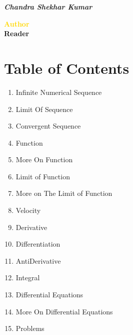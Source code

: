\thispagestyle{empty}

\vspace{3mm}

  \hfill \emph{\color{Sepia} \textbf{Chandra Shekhar Kumar}}


\begin{center}\bfseries \large
\textcolor{Gold}{Author}  \\
\textcolor{BurntOrange}{Reader} 
\end{center}

\section{Table of Contents}
\begin{enumerate}[nosep]
\item Infinite Numerical Sequence
\item Limit Of Sequence
\item Convergent Sequence 
\item Function
\item More On Function
\item Limit of Function
\item More on The Limit of Function
\item Velocity
\item Derivative
\item Differentiation
\item AntiDerivative
\item Integral
\item Differential Equations
\item More On Differential Equations
\item Problems
\end{enumerate}

\hrulefill

\newtheorem{probl}{\textcolor{Gold}{\textbf{\textsc{Author}}}}[chapter]

\renewenvironment{p}    %
  {\renewcommand{\qedsymbol}{$\lozenge$}%
   \pushQED{\qed}\begin{probl}}
  {\popQED\end{probl}}
  
\renewenvironment{s}
  {\renewcommand{\qedsymbol}{\tiny$\blacksquare$}
  \vspace{-\baselineskip}
  \begin{proof}[\emph{\textbf{\scshape \textcolor{BurntOrange}{Reader}}}]\color{zinnwalditebrown}}
  {\end{proof}} 

